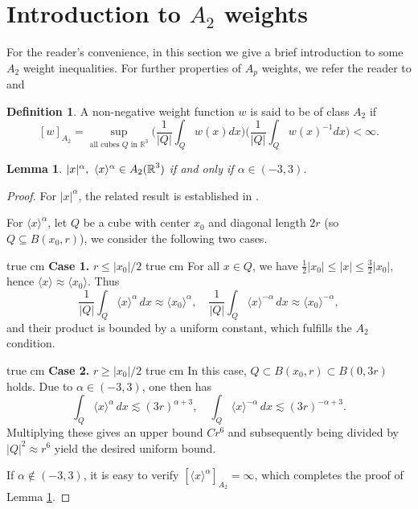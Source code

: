 \documentclass[11pt,twoside]{article}
\def\R{\mathop{\mathbb R\kern 0pt}\nolimits}
\def\f{\frac}
\newcommand{\w}[1]{\langle {#1} \rangle}
\theoremstyle{plain}
\newtheorem{lemma}[theorem]{Lemma}
\theoremstyle{definition}
\newtheorem{definition}[theorem]{Definition}
\numberwithin{equation}{section}
\begin{document}
\section{Introduction to $A_2$ weights}\label{section a}
For the reader's convenience, in this section we give a brief introduction to some $A_2$ weight inequalities.
For further properties of $A_p$ weights, we refer the reader to \cite[Chapter 7]{Grafakos} and \cite[Chapter V]{Stein}
\begin{definition}
A non-negative weight function $w$ is said to be of class $A_2$ if
\begin{equation}\label{def:A_2 weight}
[w]_{A_2}=\sup_{\text{all cubes $Q$ in } \mathbb{R}^3}\big(\frac{1}{|Q|} \int_Q w(x) dx\big)\big(\frac{1}{|Q|} \int_Q w(x)^{-1} dx\big)<\infty. 	
\end{equation}

\end{definition}
\begin{lemma}\label{lem:w{x} in A2}
	$|x|^\alpha,\ \w{x}^{\alpha} \in A_2(\R^3)$ if and only if $\alpha\in(-3,3)$.
\end{lemma}
\begin{proof}
 For $|x|^\alpha$, the related result is established in \cite[Chapter V, p.~218]{Stein}.

For $\langle x \rangle^\alpha$,
let $Q$ be a cube with center $x_0$ and diagonal length $2r$ (so $Q \subseteq B(x_0, r)$), we consider the following two cases.

  true cm
 \noindent\textbf{Case 1.} $r \leq |x_0|/2$
  true cm
 For all $x \in Q$, we have $\frac{1}{2}|x_0| \leq |x| \leq \frac{3}{2}|x_0|$, hence $\langle x \rangle \approx \langle x_0 \rangle$. Thus
 \[
 \f{1}{|Q|}\int_Q \langle x \rangle^\alpha \, dx \approx \langle x_0 \rangle^\alpha , \quad \f{1}{|Q|}\int_Q \langle x \rangle^{-\alpha} \, dx \approx \langle x_0 \rangle^{-\alpha},
 \]
 and their product is bounded by a uniform constant, which fulfills the $A_2$ condition.

  true cm
 \noindent\textbf{Case 2.} $r \geq |x_0|/2$
 true cm
 In this case, $Q \subset B(x_0, r) \subset B(0, 3r)$ holds.
 Due to $\alpha \in (-3, 3)$, one then has
 \[
 \int_Q \langle x \rangle^\alpha \, dx \lesssim (3r)^{\alpha+3}, \quad \int_Q \langle x \rangle^{-\alpha} \, dx \lesssim (3r)^{-\alpha+3}.
 \]
 Multiplying these gives an upper bound $C r^6$ and subsequently being divided by $|Q|^2 \approx r^6$ yield the desired uniform bound.

 If $\alpha \notin (-3, 3)$, it is easy to verify $[\w{x}^\alpha]_{A_2} = \infty$, which completes the proof of Lemma \ref{lem:w{x} in A2}.
\end{proof}
\end{document}
